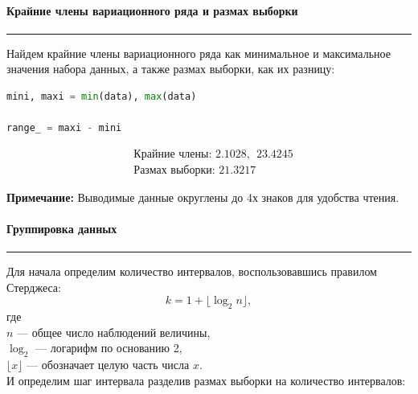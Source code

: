 \documentclass[a4paper, 14pt]{extarticle}
\begin{document}
\paragraph{Крайние члены вариационного ряда и размах выборки}\vspace{-20pt}\rule{\linewidth}{0.1mm}

Найдем крайние члены вариационного ряда как минимальное и максимальное значения 
набора данных, а также размах выборки, как их разницу:

\vspace{10pt}

\begin{center}
  \begin{lstlisting}[language=Python]
mini, maxi = min(data), max(data)

range_ = maxi - mini
  \end{lstlisting}
\end{center}

\vspace{-5pt}

\begin{align*}
  & \text{Крайние члены: }  2.1028, \hspace{5pt} 23.4245 \\
  & \text{Размах выборки: }  21.3217
\end{align*}

{\footnotesize \textbf{Примечание:} Выводимые данные округлены до 4х знаков для удобства чтения.}

\paragraph{Группировка данных}\vspace{-20pt}\rule{\linewidth}{0.1mm}

Для начала определим количество интервалов, воспользовавшись правилом
Стерджеса:
\begin{equation*}
    k = 1 + \lfloor \log_2 n \rfloor,
\end{equation*}
где \\
$n$ — общее число наблюдений величины, \\ 
$\log_2$ — логарифм по основанию 2, \\
$\lfloor x \rfloor$ — обозначает целую часть числа $x$. \\

И определим шаг интервала разделив размах выборки на количество интервалов:

\vspace{10pt}
\end{document}
